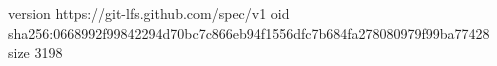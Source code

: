 version https://git-lfs.github.com/spec/v1
oid sha256:0668992f99842294d70bc7c866eb94f1556dfc7b684fa278080979f99ba77428
size 3198
